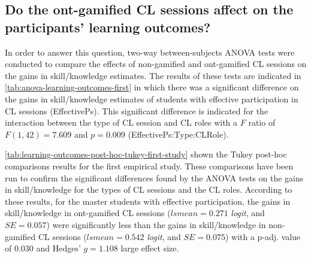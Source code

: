 \newpage
\subsection*{Do the ont-gamified CL sessions affect on the participants' learning outcomes?}

In order to answer this question, two-way between-subjects ANOVA tests were conducted to compare the effects of non-gamified and ont-gamified CL sessions on the gains in skill/knowledge estimates.
The results of these tests are indicated in \autoref{tab:anova-learning-outcomes-first} in which there was a significant difference on the gains in skill/knowledge estimates of students with effective participation in CL sessions (EffectivePs).
This significant difference is indicated for the interaction between the type of CL session and CL roles with a $F$ ratio of $F(1,42) = 7.609$ and $p = 0.009$ (EffectivePs:Type:CLRole).


\autoref{tab:learning-outcomes-post-hoc-tukey-first-study} shown the Tukey post-hoc comparisons results for the first empirical study.
These comparisons have been run to confirm the significant differences found by the ANOVA tests on the gains in skill/knowledge for the types of CL sessions and the CL roles.
According to these results, for the master students with effective participation, the gains in skill/knowledge in ont-gamified CL sessions ($lsmean = 0.271$ \emph{logit}, and $SE = 0.057$) were significantly less than the gains in skill/knowledge in non-gamified CL sessions ($lsmean = 0.542$ \emph{logit}, and $SE = 0.075$) with a p-adj. value of $0.030$ and Hedges' $g = 1.108$ large effect size.

